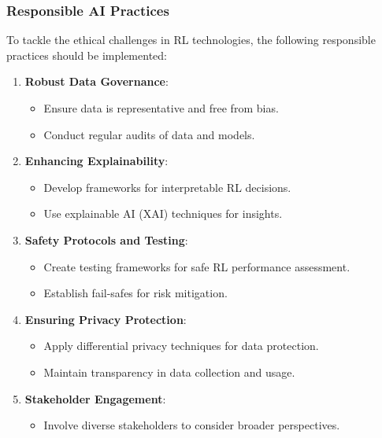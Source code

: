 \documentclass[aspectratio=169]{beamer}
\begin{document}
\begin{frame}[fragile]
    \frametitle{Responsible AI Practices}
    To tackle the ethical challenges in RL technologies, the following responsible practices should be implemented:
    \begin{enumerate}
        \item \textbf{Robust Data Governance}:
            \begin{itemize}
                \item Ensure data is representative and free from bias.
                \item Conduct regular audits of data and models.
            \end{itemize}
        
        \item \textbf{Enhancing Explainability}:
            \begin{itemize}
                \item Develop frameworks for interpretable RL decisions.
                \item Use explainable AI (XAI) techniques for insights.
            \end{itemize}
        
        \item \textbf{Safety Protocols and Testing}:
            \begin{itemize}
                \item Create testing frameworks for safe RL performance assessment.
                \item Establish fail-safes for risk mitigation.
            \end{itemize}
        
        \item \textbf{Ensuring Privacy Protection}:
            \begin{itemize}
                \item Apply differential privacy techniques for data protection.
                \item Maintain transparency in data collection and usage.
            \end{itemize}
        
        \item \textbf{Stakeholder Engagement}:
            \begin{itemize}
                \item Involve diverse stakeholders to consider broader perspectives.
            \end{itemize}
    \end{enumerate}
\end{frame}
\end{document}
